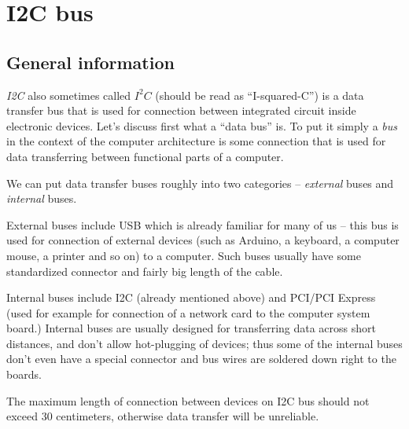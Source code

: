 \documentclass[../sparc.tex]{subfiles}
\begin{document}
\section{I2C bus}
\label{section:i2c}


\subsection{General information}

\textit{\gls{I2C}} also sometimes called $I^{2}C$ (should be read as
``I-squared-C'') is a data transfer bus that is used for connection between
integrated circuit inside electronic devices.  Let's discuss first what a ``data
bus'' is.  To put it simply a \textit{bus} in the context of the computer
architecture is some connection that is used for data transferring between
functional parts of a computer.

We can put data transfer buses roughly into two categories -- \textit{external}
buses and \textit{internal} buses.

External buses include \gls{USB} which is already familiar for many of us -- this
bus is used for connection of external devices (such as Arduino, a keyboard, a
computer mouse, a printer and so on) to a computer.  Such buses usually have
some standardized connector and fairly big length of the cable.

Internal buses include \gls{I2C} (already mentioned above) and \gls{PCI}/PCI
Express (used for example for connection of a network card to the computer
system board.)  Internal buses are usually designed for transferring data across
short distances, and don't allow hot-plugging of devices; thus some of the
internal buses don't even have a special connector and bus wires are soldered
down right to the boards.

The maximum length of connection between devices on \gls{I2C} bus should not
exceed 30 centimeters, otherwise data transfer will be unreliable.
\end{document}

